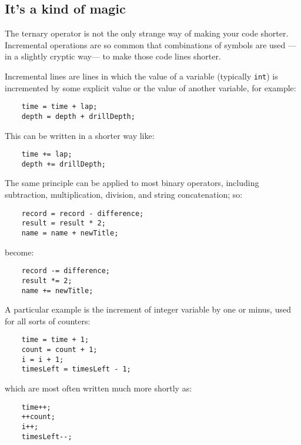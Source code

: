 \subsection{It's a kind of magic}
\label{sec:its-kind-magic}

The ternary operator is not the only strange way of making your code
shorter. Incremental operations are so common that combinations of
symbols are used ---in a slightly cryptic way--- to make those code
lines shorter.

Incremental lines are lines in which the value of a variable
(typically \verb+int+) is incremented by some explicit value or the
value of another variable, for example: 

\begin{verbatim}
    time = time + lap;
    depth = depth + drillDepth;
\end{verbatim}

This can be written in a shorter way like: 

\begin{verbatim}
    time += lap;
    depth += drillDepth;
\end{verbatim}

The same principle can be applied to most binary operators, including
subtraction, multiplication, division, and string concatenation; so: 

\begin{verbatim}
    record = record - difference; 
    result = result * 2;
    name = name + newTitle;
\end{verbatim}

become: 

\begin{verbatim}
    record -= difference; 
    result *= 2;
    name += newTitle;
\end{verbatim}

A particular example is the increment of integer variable by one or
minus, used for all sorts of counters:

\begin{verbatim}
    time = time + 1;
    count = count + 1;
    i = i + 1;
    timesLeft = timesLeft - 1;
\end{verbatim}

which are most often written much more shortly as: 

\begin{verbatim}
    time++;
    ++count;
    i++;
    timesLeft--;
\end{verbatim}

